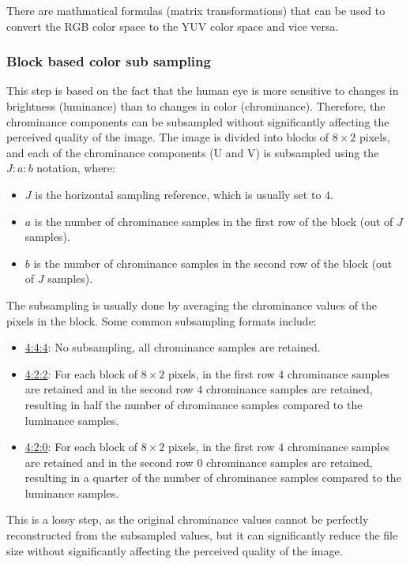 There are mathmatical formulas (matrix transformations) that can be used to convert the RGB color space to the YUV color space and vice versa.

\subsubsection{Block based color sub sampling}

This step is based on the fact that the human eye is more sensitive to changes in brightness (luminance) than to changes in color (chrominance). Therefore, the chrominance components can be subsampled without significantly affecting the perceived quality of the image. The image is divided into blocks of $8\times 2$ pixels, and each of the chrominance components (U and V) is subsampled using the $J:a:b$ notation, where:
\begin{itemize}
    \item $J$ is the horizontal sampling reference, which is usually set to $4$.
    \item $a$ is the number of chrominance samples in the first row of the block (out of $J$ samples).
    \item $b$ is the number of chrominance samples in the second row of the block (out of $J$ samples).
\end{itemize}

The subsampling is usually done by averaging the chrominance values of the pixels in the block. Some common subsampling formats include:
\begin{itemize}
    \item \ul{4:4:4}: No subsampling, all chrominance samples are retained.
    \item \ul{4:2:2}: For each block of $8\times 2$ pixels, in the first row $4$ chrominance samples are retained and in the second row $4$ chrominance samples are retained, resulting in half the number of chrominance samples compared to the luminance samples.
    \item \ul{4:2:0}: For each block of $8\times 2$ pixels, in the first row $4$ chrominance samples are retained and in the second row $0$ chrominance samples are retained, resulting in a quarter of the number of chrominance samples compared to the luminance samples.
\end{itemize}

This is a lossy step, as the original chrominance values cannot be perfectly reconstructed from the subsampled values, but it can significantly reduce the file size without significantly affecting the perceived quality of the image.

